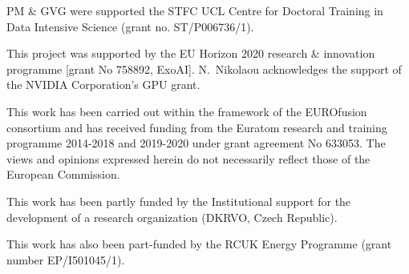 PM \& GVG were supported the STFC UCL Centre for Doctoral Training in Data Intensive
Science (grant no. ST/P006736/1).

This project was supported by the EU Horizon 2020 research \& innovation
programme [grant No 758892, ExoAI]. N.~Nikolaou acknowledges the support of the NVIDIA Corporation’s GPU grant.

This work has been carried out within the framework of the EUROfusion consortium and has received funding from the Euratom research and training programme 2014-2018 and 2019-2020 under grant agreement No 633053. The views and opinions expressed herein do not necessarily reflect those of the European Commission.

This work has been partly funded by the Institutional support for the
development of a research organization (DKRVO, Czech Republic).

This work has also been part-funded by the RCUK Energy Programme (grant number EP/I501045/1).
